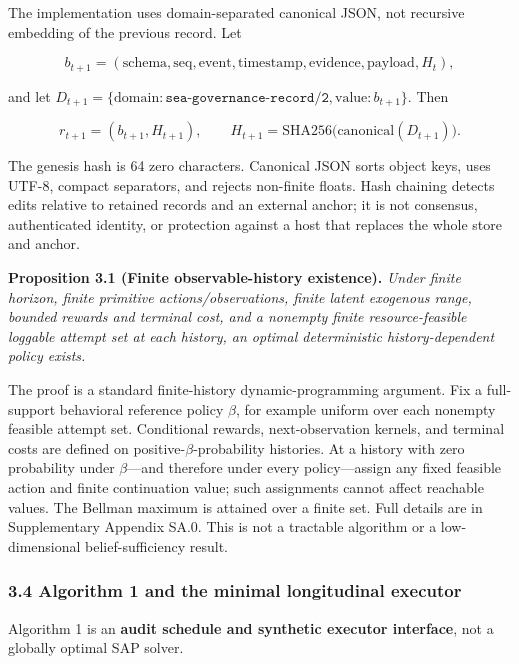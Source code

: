 \documentclass[
  11pt]{article}
\begin{document}
The implementation uses domain-separated canonical JSON, not recursive
embedding of the previous record. Let

\[b_{t+1}=(\mathrm{schema},\mathrm{seq},\mathrm{event},\mathrm{timestamp},\mathrm{evidence},\mathrm{payload},H_t),\]

and let
\(D_{t+1}=\{\mathrm{domain}:\texttt{sea-governance-record/2},\mathrm{value}:b_{t+1}\}\).
Then

\[r_{t+1}=(b_{t+1},H_{t+1}),\qquad H_{t+1}=\mathrm{SHA256}\bigl(\mathrm{canonical}(D_{t+1})\bigr).\tag{3}\]

The genesis hash is 64 zero characters. Canonical JSON sorts object
keys, uses UTF-8, compact separators, and rejects non-finite floats.
Hash chaining detects edits relative to retained records and an external
anchor; it is not consensus, authenticated identity, or protection
against a host that replaces the whole store and anchor.

\textbf{Proposition 3.1 (Finite observable-history existence).}
\emph{Under finite horizon, finite primitive actions/observations,
finite latent exogenous range, bounded rewards and terminal cost, and a
nonempty finite resource-feasible loggable attempt set at each history,
an optimal deterministic history-dependent policy exists.}

The proof is a standard finite-history dynamic-programming argument. Fix
a full-support behavioral reference policy \(\beta\), for example
uniform over each nonempty feasible attempt set. Conditional rewards,
next-observation kernels, and terminal costs are defined on
positive-\(\beta\)-probability histories. At a history with zero
probability under \(\beta\)---and therefore under every policy---assign
any fixed feasible action and finite continuation value; such
assignments cannot affect reachable values. The Bellman maximum is
attained over a finite set. Full details are in Supplementary Appendix
SA.0. This is not a tractable algorithm or a low-dimensional
belief-sufficiency result.

\subsubsection{3.4 Algorithm 1 and the minimal longitudinal
executor}\label{algorithm-1-and-the-minimal-longitudinal-executor}

Algorithm 1 is an \textbf{audit schedule and synthetic executor
interface}, not a globally optimal SAP solver.
\end{document}
